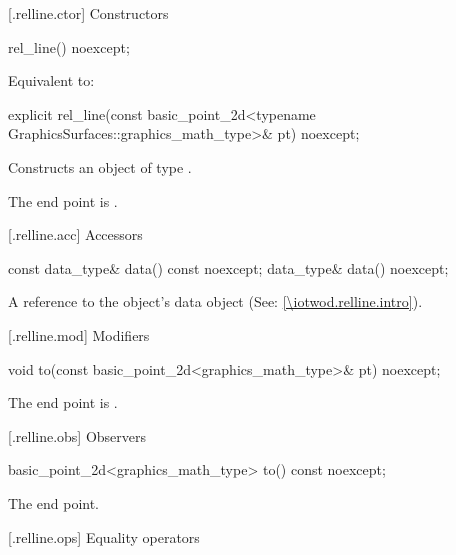  [\iotwod.relline.ctor] {Constructors}%

%
\begin{itemdecl}
rel_line() noexcept;
\end{itemdecl}
\begin{itemdescr}
\pnum
\effects Equivalent to: 
\end{itemdescr}

%
\begin{itemdecl}
explicit rel_line(const basic_point_2d<typename
  GraphicsSurfaces::graphics_math_type>& pt) noexcept;
\end{itemdecl}
\begin{itemdescr}
\pnum
\effects Constructs an object of type .

\pnum
\remarks The end point is .
\end{itemdescr}

 [\iotwod.relline.acc] {Accessors}%

%
\begin{itemdecl}
const data_type& data() const noexcept;
data_type& data() noexcept;
\end{itemdecl}
\begin{itemdescr}
\pnum
\returns A reference to the  object's data object (See: \ref{\iotwod.relline.intro}).
\end{itemdescr}

 [\iotwod.relline.mod] {Modifiers}%

%
\begin{itemdecl}
void to(const basic_point_2d<graphics_math_type>& pt) noexcept;
\end{itemdecl}
\begin{itemdescr}
\pnum
\effects The end point is .
\end{itemdescr}

 [\iotwod.relline.obs] {Observers} 

%
\begin{itemdecl}
basic_point_2d<graphics_math_type> to() const noexcept;
\end{itemdecl}
\begin{itemdescr}
\pnum
\returns The end point.
\end{itemdescr}

 [\iotwod.relline.ops] {Equality operators}%

